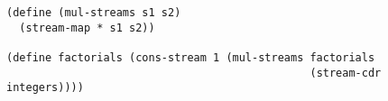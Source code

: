 \documentclass[a4paper,12pt]{article}
\begin{document}
\begin{lstlisting}
(define (mul-streams s1 s2)
  (stream-map * s1 s2))

(define factorials (cons-stream 1 (mul-streams factorials
                                               (stream-cdr integers))))
\end{lstlisting}
\end{document}
